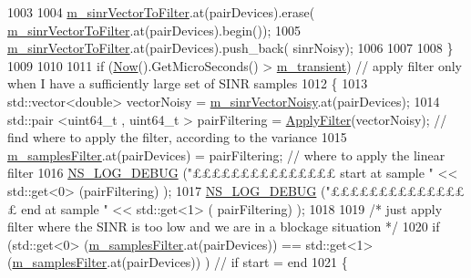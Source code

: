 \begin{DoxyCode}
1003 
1004                                 \hyperlink{classns3_1_1MmWaveEnbPhy_a2887e6ce935c6d25fc2759269b811bbe}{m\_sinrVectorToFilter}.at(pairDevices).erase(
      \hyperlink{classns3_1_1MmWaveEnbPhy_a2887e6ce935c6d25fc2759269b811bbe}{m\_sinrVectorToFilter}.at(pairDevices).begin());
1005                                 \hyperlink{classns3_1_1MmWaveEnbPhy_a2887e6ce935c6d25fc2759269b811bbe}{m\_sinrVectorToFilter}.at(pairDevices).push\_back(
      sinrNoisy);
1006 
1007 
1008                         \}
1009                                         
1010                         
1011                         \textcolor{keywordflow}{if} (\hyperlink{group__simulator_gac3635e2e87f7ce316c89290ee1b01d0d}{Now}().GetMicroSeconds() > \hyperlink{classns3_1_1MmWaveEnbPhy_a60467889c9c76cba890f049098f4a822}{m\_transient}) \textcolor{comment}{// apply filter only when
       I have a sufficiently large set of SINR samples}
1012                         \{
1013                                 std::vector<double> vectorNoisy = 
      \hyperlink{classns3_1_1MmWaveEnbPhy_a796cebfd5468736861afc539d2ec4098}{m\_sinrVectorNoisy}.at(pairDevices);
1014                                 std::pair <uint64\_t , uint64\_t > pairFiltering = 
      \hyperlink{classns3_1_1MmWaveEnbPhy_a0e187efd67bd94a6ace7856777aafe8d}{ApplyFilter}(vectorNoisy); \textcolor{comment}{// find where to apply the filter, according to the variance}
1015                                 \hyperlink{classns3_1_1MmWaveEnbPhy_afee86fc55fdcef25ada2042be5740c62}{m\_samplesFilter}.at(pairDevices) = pairFiltering; \textcolor{comment}{// where to
       apply the linear filter}
1016                                 \hyperlink{group__logging_ga413f1886406d49f59a6a0a89b77b4d0a}{NS\_LOG\_DEBUG} (\textcolor{stringliteral}{"£££££££££££££££ start at sample "} << std::get<0>
       (pairFiltering) );
1017                                 \hyperlink{group__logging_ga413f1886406d49f59a6a0a89b77b4d0a}{NS\_LOG\_DEBUG} (\textcolor{stringliteral}{"£££££££££££££££ end at sample "} << std::get<1> (
      pairFiltering) );
1018                 
1019                                 \textcolor{comment}{/* just apply filter where the SINR is too low and we are in a blockage
       situation */}
1020                                 \textcolor{keywordflow}{if} (std::get<0> (\hyperlink{classns3_1_1MmWaveEnbPhy_afee86fc55fdcef25ada2042be5740c62}{m\_samplesFilter}.at(pairDevices)) == 
      std::get<1> (\hyperlink{classns3_1_1MmWaveEnbPhy_afee86fc55fdcef25ada2042be5740c62}{m\_samplesFilter}.at(pairDevices)) ) \textcolor{comment}{// if start = end}
1021                                 \{

\end{DoxyCode}
